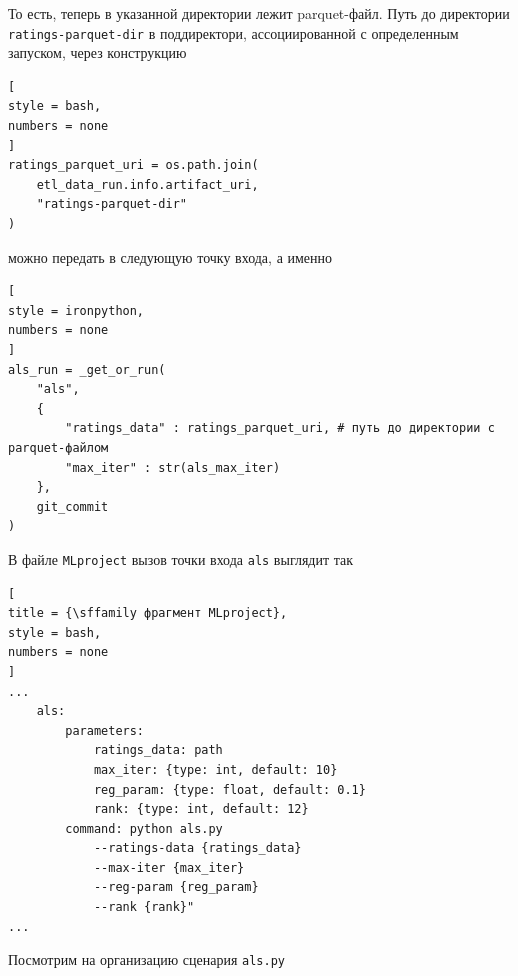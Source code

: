 \documentclass[%
	11pt,
	a4paper,
	utf8,
		]{article}
\begin{document}
То есть, теперь в указанной директории лежит parquet-файл. Путь до директории \texttt{ratings-parquet-dir} в поддиректори, ассоциированной с определенным запуском, через конструкцию
\begin{lstlisting}[
style = bash,
numbers = none	
]
ratings_parquet_uri = os.path.join(
    etl_data_run.info.artifact_uri,
    "ratings-parquet-dir"
)
\end{lstlisting}
можно передать в следующую точку входа, а именно
\begin{lstlisting}[
style = ironpython,
numbers = none	
]
als_run = _get_or_run(
    "als",
    {
        "ratings_data" : ratings_parquet_uri, # путь до директории с parquet-файлом
        "max_iter" : str(als_max_iter)
    },
    git_commit
)
\end{lstlisting}

В файле \texttt{MLproject} вызов точки входа \texttt{als} выглядит так
\begin{lstlisting}[
title = {\sffamily фрагмент MLproject},
style = bash,
numbers = none	
]
...
	als:
		parameters:
			ratings_data: path
			max_iter: {type: int, default: 10}
			reg_param: {type: float, default: 0.1}
			rank: {type: int, default: 12}
		command: python als.py
			--ratings-data {ratings_data}
			--max-iter {max_iter}
			--reg-param {reg_param}
			--rank {rank}"
...
\end{lstlisting}

Посмотрим на организацию сценария \texttt{als.py}
\end{document}
